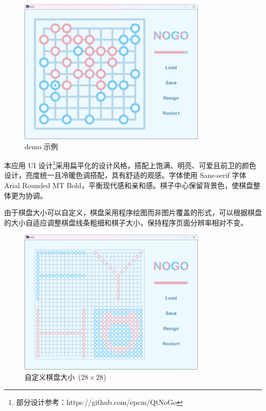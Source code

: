 \documentclass{noithesis}
\begin{document}
	\begin{figure}[!htb]{
		\centering
		\includegraphics[width=0.8\textwidth]{img/UI.png}
		\caption{demo 示例}
	}
	\end{figure}

	本应用 UI 设计\footnote{部分设计参考：https://github.com/epcm/QtNoGo}采用扁平化的设计风格，搭配上饱满、明亮、可爱且前卫的颜色设计，亮度统一且冷暖色调搭配，具有舒适的观感。字体使用 Sans-serif 字体 Arial Rounded MT Bold，平衡现代感和亲和感。棋子中心保留背景色，使棋盘整体更为协调。
	
	由于棋盘大小可以自定义，棋盘采用程序绘图而非图片覆盖的形式，可以根据棋盘的大小自适应调整棋盘线条粗细和棋子大小，保持程序页面分辨率相对不变。
	
	\begin{figure}[!htb]{
			\centering
			\includegraphics[width=0.8\textwidth]{img/fyh.png}
			\caption{自定义棋盘大小~($28\times 28$)}
		}
	\end{figure}
	
\end{document}
